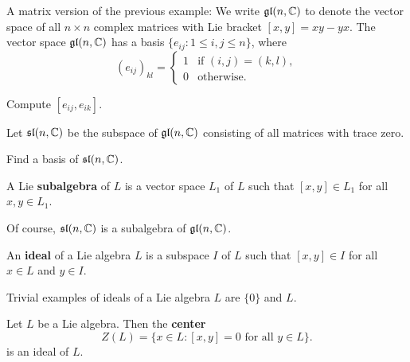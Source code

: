 A matrix version of the previous example: We write $\mathfrak{gl}(n,\mathbb{C})$ 
to denote the vector space of all $n\times n$ complex 
matrices with Lie bracket $[x,y]=xy-yx$. The vector space
$\mathfrak{gl}(n,\mathbb{C})$ has a basis $\{e_{ij}:1\leq i,j\leq n\}$, where
\[
(e_{ij})_{kl}=\begin{cases} 
    1 & \text{if $(i,j)=(k,l)$},\\
    0 & \text{otherwise}.
    \end{cases}
\]

\begin{exercise}
    Compute $[e_{ij},e_{ik}]$.
\end{exercise}

\begin{example}
    Let $\mathfrak{sl}(n,\mathbb{C})$ be the subspace of $\mathfrak{gl}(n,\mathbb{C})$ consisting
    of all matrices with trace zero. 
\end{example}

\begin{exercise}
    Find a basis of $\mathfrak{sl}(n,\mathbb{C})$. 
\end{exercise}


\begin{definition}
    A Lie \textbf{subalgebra} of $L$ is a vector space $L_1$ of $L$ 
    such that $[x,y]\in L_1$ for all $x,y\in L_1$. 
\end{definition}

Of course, $\mathfrak{sl}(n,\mathbb{C})$ is a subalgebra of $\mathfrak{gl}(n,\mathbb{C})$. 

\begin{definition}
    An \textbf{ideal} of a Lie algebra $L$ is a subspace $I$ of $L$ 
    such that $[x,y]\in I$ for all $x\in L$ and $y\in I$. 
\end{definition}

Trivial examples of ideals of a Lie algebra $L$ are
$\{0\}$ and $L$.

\begin{example}
    Let $L$ be a Lie algebra. Then 
    the \textbf{center} 
    \[
    Z(L)=\{x\in L:[x,y]=0\text{ for all $y\in L$}\}.
    \]
    is an ideal of $L$. 
\end{example}


